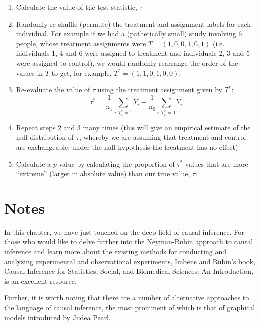 \begin{enumerate}
\item Calculate the value of the test statistic, $\tau$
\item Randomly re-shuffle (permute) the treatment and assignment labels for each individual. For example if we had a (pathetically small) study involving 6 people, whose treatment assignments were $T = (1, 0, 0, 1, 0, 1)$ (i.e. individuals 1, 4 and 6 were assigned to treatment and individuals 2, 3 and 5 were assigned to control), we would randomly rearrange the order of the values in $T$ to get, for example, $T^* = (1, 1, 0, 1, 0, 0)$. 
\item Re-evaluate the value of $\tau$ using the treatment assignment given by $T^*$: 
$$\tau^* = \frac{1}{n_1} \sum_{i:T^*_i = 1}Y_i - \frac{1}{n_0} \sum_{i:T^*_i = 0}Y_i$$
\item Repeat steps 2 and 3 many times (this will give an empirical estimate of the null distribution of $\tau$, whereby we are assuming that treatment and control are exchangeable: under the null hypothesis the treatment has no effect)
\item Calculate a $p$-value by calculating the proportion of $\tau^*$ values that are more ``extreme'' (larger in absolute value) than our true value, $\tau$.
\end{enumerate}

\section{Notes}



In this chapter, we have just touched on the deep field of causal inference. For those who would like to delve further into the Neyman-Rubin approach to causal inference and learn more about the existing methods for conducting and analyzing experimental and observational experiments, Imbens and Rubin's book, Causal Inference for Statistics, Social, and Biomedical Sciences: An Introduction, is an excellent resource.

Further, it is worth noting that there are a number of alternative approaches to the language of causal inference, the most prominent of which is that of graphical models introduced by Judea Pearl.
